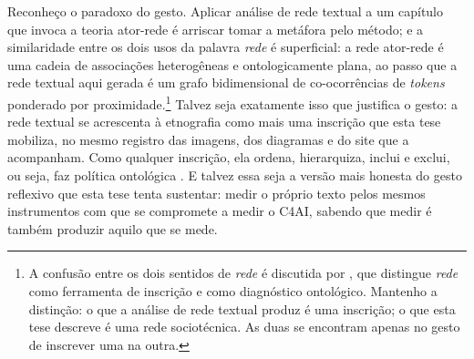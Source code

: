 Reconheço o paradoxo do gesto. Aplicar análise de rede textual a um
capítulo que invoca a teoria ator-rede é arriscar tomar a metáfora
pelo método; e a similaridade entre os dois usos da palavra
\textit{rede} é superficial: a rede ator-rede é uma cadeia de
associações heterogêneas e ontologicamente plana, ao passo que a rede
textual aqui gerada é um grafo bidimensional de co-ocorrências de
\textit{tokens} ponderado por proximidade.\footnote{A confusão entre
os dois sentidos de \textit{rede} é discutida por
\textcite[pp.~129--132]{latour2005reassembling}, que distingue
\textit{rede} como ferramenta de inscrição e como diagnóstico
ontológico. Mantenho a distinção: o que a análise de rede textual
produz é uma inscrição; o que esta tese descreve é uma rede
sociotécnica. As duas se encontram apenas no gesto de inscrever uma
na outra.} Talvez seja exatamente isso que justifica
o gesto: a rede textual se acrescenta à etnografia como mais uma
inscrição que esta tese mobiliza, no mesmo registro das imagens, dos
diagramas e do site que a acompanham. Como qualquer inscrição, ela
ordena, hierarquiza, inclui e exclui, ou seja, faz política ontológica
\parencite[p.~143]{Law2004After}. E talvez essa seja a versão mais
honesta do gesto reflexivo que esta tese tenta sustentar: medir o
próprio texto pelos mesmos instrumentos com que se compromete a medir o
C4AI, sabendo que medir é também produzir aquilo que se mede.

%
%
%
%
